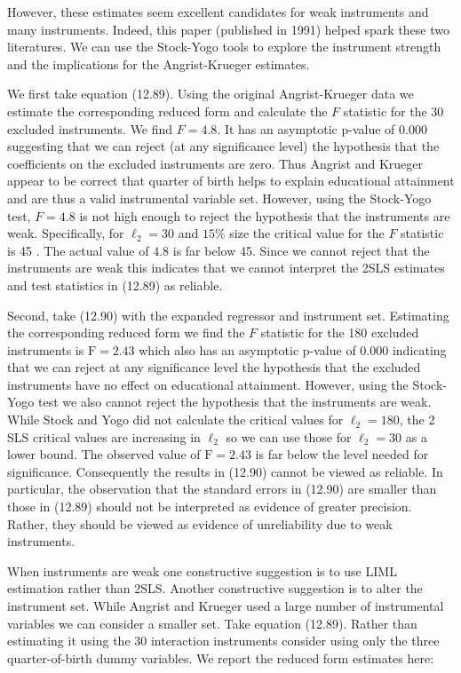 \documentclass[10pt]{article}
\begin{document}
However, these estimates seem excellent candidates for weak instruments and many instruments. Indeed, this paper (published in 1991) helped spark these two literatures. We can use the Stock-Yogo tools to explore the instrument strength and the implications for the Angrist-Krueger estimates.

We first take equation (12.89). Using the original Angrist-Krueger data we estimate the corresponding reduced form and calculate the $F$ statistic for the 30 excluded instruments. We find $F=4.8$. It has an asymptotic p-value of $0.000$ suggesting that we can reject (at any significance level) the hypothesis that the coefficients on the excluded instruments are zero. Thus Angrist and Krueger appear to be correct that quarter of birth helps to explain educational attainment and are thus a valid instrumental variable set. However, using the Stock-Yogo test, $F=4.8$ is not high enough to reject the hypothesis that the instruments are weak. Specifically, for $\ell_{2}=30$ and $15 \%$ size the critical value for the $F$ statistic is 45 . The actual value of $4.8$ is far below 45. Since we cannot reject that the instruments are weak this indicates that we cannot interpret the 2SLS estimates and test statistics in (12.89) as reliable.

Second, take (12.90) with the expanded regressor and instrument set. Estimating the corresponding reduced form we find the $F$ statistic for the 180 excluded instruments is $\mathrm{F}=2.43$ which also has an asymptotic p-value of $0.000$ indicating that we can reject at any significance level the hypothesis that the excluded instruments have no effect on educational attainment. However, using the Stock-Yogo test we also cannot reject the hypothesis that the instruments are weak. While Stock and Yogo did not calculate the critical values for $\ell_{2}=180$, the 2 SLS critical values are increasing in $\ell_{2}$ so we can use those for $\ell_{2}=30$ as a lower bound. The observed value of $\mathrm{F}=2.43$ is far below the level needed for significance. Consequently the results in (12.90) cannot be viewed as reliable. In particular, the observation that the standard errors in (12.90) are smaller than those in (12.89) should not be interpreted as evidence of greater precision. Rather, they should be viewed as evidence of unreliability due to weak instruments.

When instruments are weak one constructive suggestion is to use LIML estimation rather than 2SLS. Another constructive suggestion is to alter the instrument set. While Angrist and Krueger used a large number of instrumental variables we can consider a smaller set. Take equation (12.89). Rather than estimating it using the 30 interaction instruments consider using only the three quarter-of-birth dummy variables. We report the reduced form estimates here:
\end{document}
